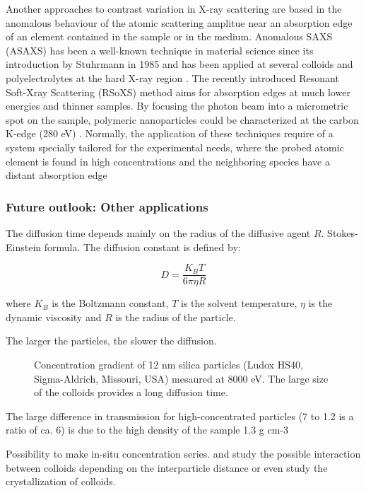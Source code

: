 Another approaches to contrast variation in X-ray scattering are based in the anomalous behaviour of the atomic scattering amplitue near an absorption edge of an element contained in the sample or in the medium. Anomalous SAXS (ASAXS) has been a well-known technique in material science since its introduction by Stuhrmann in 1985\cite{stuhrmann_resonance_1985} and has been applied at several colloids and polyelectrolytes at the hard X-ray region \citep{goerigk_anomalous_2003, stuhrmann_contrast_2007}. The recently introduced Resonant Soft-Xray Scattering (RSoXS) method aims for absorption edges at much lower energies and thinner samples. By focusing the photon beam into a micrometric spot on the sample, polymeric nanoparticles could be characterized at the carbon K-edge (280 eV) \citep{araki_resonant_2006-1}. Normally, the application of these techniques require of a system specially tailored for the experimental needs, where the probed atomic element is found in high concentrations and the neighboring species have a distant absorption edge

\subsubsection{Future outlook: Other applications}

The diffusion time depends mainly on the radius of the diffusive agent $R$. Stokes-Einstein formula. The diffusion constant is defined by:

\begin{equation}
        D=\frac{K_B T}{6\pi \eta R}
\end{equation}

where $K_B$ is the Boltzmann constant, $T$ is the solvent temperature, $\eta$ is the dynamic viscosity and $R$ is the radius of the particle.


The larger the particles, the slower the diffusion.

\begin{figure}%
	\centering
		
		\caption{Concentration gradient of 12 nm silica particles (Ludox HS40, Sigma-Aldrich, Missouri, USA) mesaured at 8000 eV. The large size of the colloids provides a long diffusion time.}
		\label{fig:LudoxHS40TransmissionCalibration}
\end{figure}

The large difference in transmission for high-concentrated particles (7 to 1.2 is a ratio of ca. 6) is due to the high density of the sample 1.3 g cm-3

Possibility to make in-situ concentration series. and study the possible interaction between colloids depending on the interparticle distance or even study the crystallization of colloids\citep{hellsing_structure_2012}.
